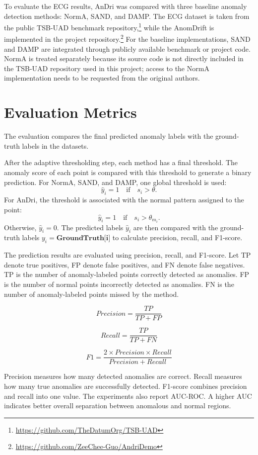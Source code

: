 \noindent To evaluate the ECG results, AnDri was compared with three baseline anomaly detection methods: NormA, SAND, and DAMP. The ECG dataset is taken from the public TSB-UAD benchmark repository,\footnote{\url{https://github.com/TheDatumOrg/TSB-UAD}} while the AnomDrift is implemented in the project repository.\footnote{\url{https://github.com/ZeeChee-Guo/AndriDemo}} For the baseline implementations, SAND and DAMP are integrated through publicly available benchmark or project code. NormA is treated separately because its source code is not directly included in the TSB-UAD repository used in this project; access to the NormA implementation needs to be requested from the original authors.


\section{Evaluation Metrics}


The evaluation compares the final predicted anomaly labels with the ground-truth labels in the datasets.

After the adaptive thresholding step, each method has a final threshold. The anomaly score of each point is compared with this threshold to generate a binary prediction. For NormA, SAND, and DAMP, one global threshold is used:
\[\hat{y}_i = 1 \quad \text{if} \quad s_i > \theta.\]
For AnDri, the threshold is associated with the normal pattern assigned to the point:
\[ \hat{y}_i = 1 \quad \text{if} \quad s_i > \theta_{m_i}.\]
Otherwise, \(\hat{y}_i = 0\). The predicted labels \(\hat{y}_i\) are then compared with the ground-truth labels \(y_i = \textbf{GroundTruth[i]}\) to calculate precision, recall, and F1-score.

The prediction results are evaluated using precision, recall, and F1-score. Let TP denote true positives, FP denote false positives, and FN denote false negatives. TP is the number of anomaly-labeled points correctly detected as anomalies. FP is the number of normal points incorrectly detected as anomalies. FN is the number of anomaly-labeled points missed by the method.

\[Precision = \frac{TP}{TP + FP}\]

\[Recall = \frac{TP}{TP + FN}\]

\[F1 = \frac{2 \times Precision \times Recall}{Precision + Recall}\]

Precision measures how many detected anomalies are correct. Recall measures how many true anomalies are successfully detected. F1-score combines precision and recall into one value. The experiments also report AUC-ROC. A higher AUC indicates better overall separation between anomalous and normal regions.



